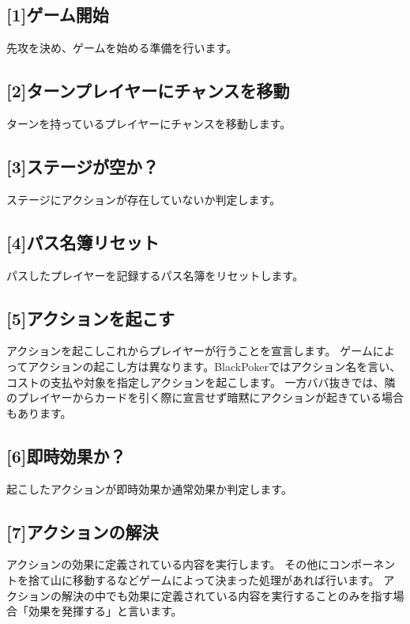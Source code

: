 \documentclass[letterpaper,10pt,dvipdfmx]{sphinxmanual}
\begin{document}
\subsection{{[}1{]}ゲーム開始}
\label{\detokenize{core/core:gamestart}}\label{\detokenize{core/core:id14}}
\sphinxAtStartPar
先攻を決め、ゲームを始める準備を行います。


\subsection{{[}2{]}ターンプレイヤーにチャンスを移動}
\label{\detokenize{core/core:id15}}
\sphinxAtStartPar
ターンを持っているプレイヤーにチャンスを移動します。


\subsection{{[}3{]}ステージが空か？}
\label{\detokenize{core/core:id16}}
\sphinxAtStartPar
ステージにアクションが存在していないか判定します。


\subsection{{[}4{]}パス名簿リセット}
\label{\detokenize{core/core:id17}}
\sphinxAtStartPar
パスしたプレイヤーを記録するパス名簿をリセットします。


\subsection{{[}5{]}アクションを起こす}
\label{\detokenize{core/core:id18}}
\sphinxAtStartPar
アクションを起こしこれからプレイヤーが行うことを宣言します。
ゲームによってアクションの起こし方は異なります。BlackPokerではアクション名を言い、コストの支払や対象を指定しアクションを起こします。
一方ババ抜きでは、隣のプレイヤーからカードを引く際に宣言せず暗黙にアクションが起きている場合もあります。


\subsection{{[}6{]}即時効果か？}
\label{\detokenize{core/core:id19}}
\sphinxAtStartPar
起こしたアクションが即時効果か通常効果か判定します。


\subsection{{[}7{]}アクションの解決}
\label{\detokenize{core/core:actresolve}}\label{\detokenize{core/core:id20}}
\sphinxAtStartPar
アクションの効果に定義されている内容を実行します。
その他にコンポーネントを捨て山に移動するなどゲームによって決まった処理があれば行います。
アクションの解決の中でも効果に定義されている内容を実行することのみを指す場合「効果を発揮する」と言います。
\end{document}
